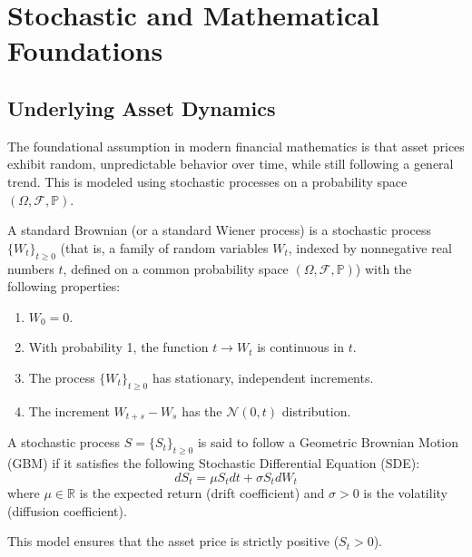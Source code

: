 \chapter{Stochastic and Mathematical Foundations}

\section{Underlying Asset Dynamics}

The foundational assumption in modern financial mathematics is that asset prices exhibit random, unpredictable behavior over time, while still following a general trend. This is modeled using stochastic processes on a probability space \((\Omega, \mathcal{F}, \mathbb{P})\).

\begin{definition}
A standard Brownian (or a standard Wiener process) is a stochastic process \(\{W_t\}_{t \geq 0}\) (that is, a family of random variables \(W_t\), indexed by nonnegative real numbers \(t\), defined on a common probability space \((\Omega, \mathcal{F}, \mathbb{P})\)) with the following properties:
\begin{enumerate}
    \item \(W_0 = 0\).
    \item With probability 1, the function \(t \to W_t\) is continuous in \(t\).
    \item The process \(\{W_t\}_{t \geq 0}\) has stationary, independent increments.
    \item The increment \(W_{t+s} - W_{s}\) has the \(\mathcal{N}(0, t)\) distribution.
\end{enumerate}
\end{definition}

\begin{definition}
A stochastic process \(S = \{S_t\}_{t \geq 0}\) is said to follow a Geometric Brownian Motion (GBM) if it satisfies the following Stochastic Differential Equation (SDE):
\begin{equation}
    dS_t = \mu S_t dt + \sigma S_t dW_t
\end{equation}
where \(\mu \in \mathbb{R}\) is the expected return (drift coefficient) and \(\sigma > 0\) is the volatility (diffusion coefficient).
\end{definition}

\begin{remark}
    This model ensures that the asset price is strictly positive (\(S_t > 0\)).
\end{remark}


